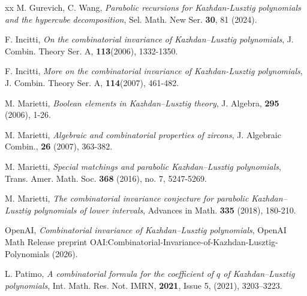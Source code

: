 \documentclass[12pt,reqno]{amsart}
\theoremstyle{plain}
\theoremstyle{definition}
\theoremstyle{remark}
\begin{document}
\begin{thebibliography}{xx}
M. Gurevich, C. Wang, {\em Parabolic recursions for Kazhdan-Lusztig polynomials and the hypercube decomposition}, Sel. Math. New Ser. {\bf 30}, 81 (2024). %

F. Incitti, {\em On the combinatorial invariance of Kazhdan–Lusztig polynomials}, J. Combin. Theory Ser. A, {\bf 113}(2006), 1332-1350.

F. Incitti, {\em More on the combinatorial invariance of Kazhdan-Lusztig polynomials}, J. Combin. Theory Ser. A, {\bf 114}(2007), 461-482.

 M. Marietti, {\em Boolean elements in Kazhdan–Lusztig theory}, J. Algebra, {\bf 295} (2006), 1-26.

 M. Marietti, {\em Algebraic and combinatorial properties of zircons}, J. Algebraic Combin., {\bf 26} (2007), 363-382.

 M. Marietti, {\em Special matchings and parabolic Kazhdan--Lusztig polynomials},  Trans. Amer. Math. Soc. {\bf 368} (2016), no. 7, 5247-5269.

 M. Marietti, {\em The combinatorial invariance conjecture for parabolic Kazhdan--Lusztig polynomials of lower intervals},  Advances in Math. {\bf 335} (2018), 180-210.

 OpenAI, {\em Combinatorial invariance of Kazhdan--Lusztig polynomials},  OpenAI Math Release preprint
{OAI:Combinatorial-Invariance-of-Kazhdan-Lusztig-Polynomials} (2026).

L. Patimo, {\em A combinatorial formula for the coefficient of $q$ of Kazhdan--Lusztig polynomials},  Int. Math. Res. Not. IMRN, {\bf 2021}, Issue 5, (2021), 3203–3223.

\end{thebibliography} 
\end{document}
